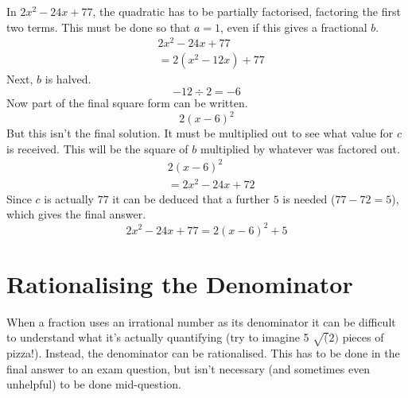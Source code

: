 In $2x^2-24x+77$, the quadratic has to be partially factorised, factoring the first two terms. This must be done so that $a=1$, even if this gives a fractional $b$.
\begin{align*}
	&2x^2-24x+77\\
	&=2(x^2-12x)+77
\end{align*}
Next, $b$ is halved.
\begin{equation*}
	-12 \div 2 = -6
\end{equation*}
Now part of the final square form can be written.
\begin{equation*}
	2(x-6)^2
\end{equation*}
But this isn't the final solution. It must be multiplied out to see what value for $c$ is received. This will be the square of $b$ multiplied by whatever was factored out.
\begin{align*}
	&2(x-6)^2\\
	&=2x^2-24x+72
\end{align*}
Since $c$ is actually $77$ it can be deduced that a further $5$ is needed ($77-72=5$), which gives the final answer.
\begin{equation*}
	2x^2 - 24x + 77 = 2(x-6)^2+5
\end{equation*}

\section{Rationalising the Denominator}
When a fraction uses an irrational number as its denominator it can be difficult to understand what it's actually quantifying (try to imagine 5 $\sqrt(2)$ pieces of pizza!). Instead, the denominator can be rationalised. This has to be done in the final answer to an exam question, but isn't necessary (and sometimes even unhelpful) to be done mid-question.


